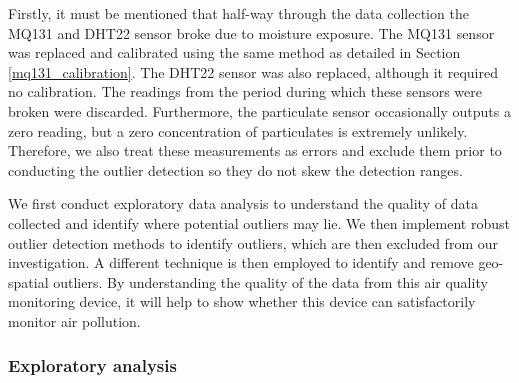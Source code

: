 \documentclass[11pt]{report}
\begin{document}
Firstly, it must be mentioned that half-way through the data collection the MQ131 and DHT22 sensor broke due to moisture exposure. The MQ131 sensor was replaced and calibrated using the same method as detailed in Section \ref{mq131_calibration}. The DHT22 sensor was also replaced, although it required no calibration. The readings from the period during which these sensors were broken were discarded. Furthermore, the particulate sensor occasionally outputs a zero reading, but a zero concentration of particulates is extremely unlikely. Therefore, we also treat these measurements as errors and exclude them prior to conducting the outlier detection so they do not skew the detection ranges.

We first conduct exploratory data analysis to understand the quality of data collected and identify where potential outliers may lie. We then implement robust outlier detection methods to identify outliers, which are then excluded from our investigation. A different technique is then employed to identify and remove geo-spatial outliers. By understanding the quality of the data from this air quality monitoring device, it will help to show whether this device can satisfactorily monitor air pollution.

\subsubsection{Exploratory analysis}
\end{document}
